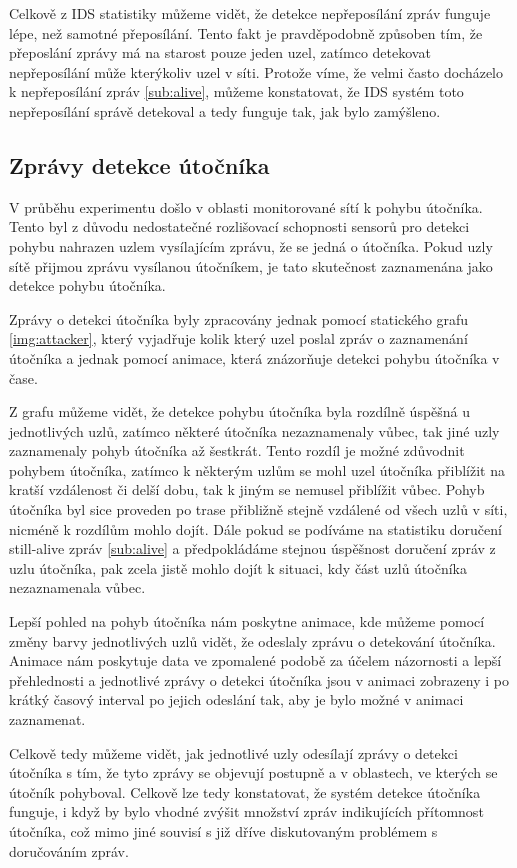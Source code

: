 \documentclass[11pt,final,twoside]{fithesis2}
\begin{document}
Celkově z IDS statistiky můžeme vidět, že detekce nepřeposílání zpráv funguje lépe, než samotné přeposílání. Tento fakt je pravděpodobně 
způsoben tím, že přeposlání zprávy má na starost pouze jeden uzel, zatímco detekovat nepřeposílání může kterýkoliv uzel v síti.
Protože víme, že velmi často docházelo k nepřeposílání zpráv \ref{sub:alive}, můžeme konstatovat, že IDS systém toto nepřeposílání správě
detekoval a tedy funguje tak, jak bylo zamýšleno.


\subsection{Zprávy detekce útočníka}

V průběhu experimentu došlo v oblasti monitorované sítí k pohybu útočníka. Tento byl z důvodu nedostatečné rozlišovací schopnosti sensorů 
pro detekci pohybu nahrazen uzlem vysílajícím zprávu, že se jedná o útočníka. Pokud uzly sítě přijmou zprávu vysílanou útočníkem, je tato 
skutečnost zaznamenána jako detekce pohybu útočníka. 

Zprávy o detekci útočníka byly zpracovány jednak pomocí statického grafu \ref{img:attacker}, který vyjadřuje kolik který uzel poslal 
zpráv o zaznamenání útočníka a jednak pomocí animace, která znázorňuje detekci pohybu útočníka v čase. 

Z grafu můžeme vidět, že detekce pohybu útočníka byla rozdílně úspěšná u jednotlivých uzlů, zatímco některé útočníka nezaznamenaly vůbec, 
tak jiné uzly zaznamenaly pohyb útočníka až šestkrát. Tento rozdíl je možné zdůvodnit pohybem útočníka, zatímco k některým uzlům se mohl 
uzel útočníka přiblížit na kratší vzdálenost či delší dobu, tak k jiným se nemusel přiblížit vůbec. Pohyb útočníka byl sice proveden 
po trase přibližně stejně vzdálené od všech uzlů v síti, nicméně k rozdílům mohlo dojít. Dále pokud se podíváme na statistiku doručení 
still-alive zpráv \ref{sub:alive} a předpokládáme stejnou úspěšnost doručení zpráv z uzlu útočníka, pak zcela jistě mohlo dojít k 
situaci, kdy část uzlů útočníka nezaznamenala vůbec. 

Lepší pohled na pohyb útočníka nám poskytne animace, kde můžeme pomocí změny barvy jednotlivých uzlů vidět, že odeslaly zprávu o 
detekování útočníka. Animace nám poskytuje data ve zpomalené podobě za účelem názornosti a lepší přehlednosti a jednotlivé zprávy 
o detekci útočníka jsou v animaci zobrazeny i po krátký časový interval po jejich odeslání tak, aby je bylo možné v animaci zaznamenat.

Celkově tedy můžeme vidět, jak jednotlivé uzly odesílají zprávy o detekci útočníka s tím, že tyto zprávy se objevují postupně a 
v oblastech, ve kterých se útočník pohyboval. Celkově lze tedy konstatovat, že systém detekce útočníka funguje, i když by bylo vhodné 
zvýšit množství zpráv indikujících přítomnost útočníka, což mimo jiné souvisí s již dříve diskutovaným problémem s doručováním zpráv. 
\end{document}
